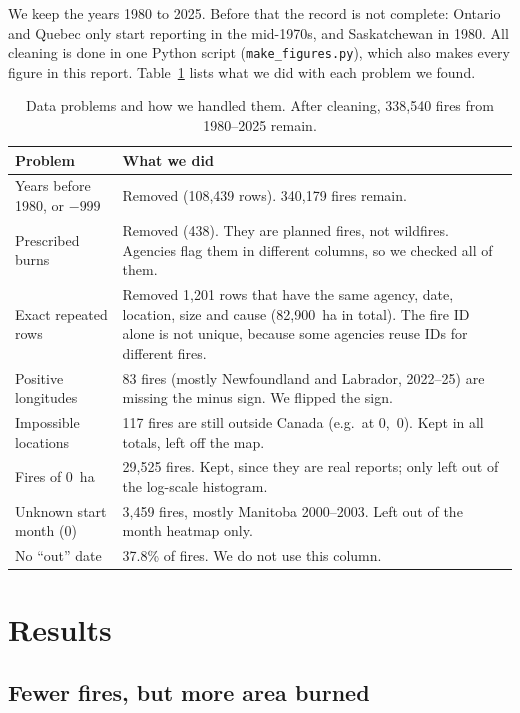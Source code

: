 \documentclass[12pt]{article}
\begin{document}
We keep the years 1980 to 2025. Before that the record is not complete:
Ontario and Quebec only start reporting in the mid-1970s, and Saskatchewan in
1980. All cleaning is done in one Python script
(\texttt{make\_figures.py}), which also makes every figure in this report.
Table~\ref{tab:cleaning} lists what we did with each problem we found.

\begin{table}[ht]
\centering
\small
\begin{tabular}{p{5.4cm}p{9.4cm}}
\toprule
\textbf{Problem} & \textbf{What we did} \\
\midrule
Years before 1980, or $-999$ & Removed (108,439 rows). 340,179 fires remain. \\
Prescribed burns & Removed (438). They are planned fires, not wildfires.
  Agencies flag them in different columns, so we checked all of them. \\
Exact repeated rows & Removed 1,201 rows that have the same agency, date,
  location, size and cause (82,900~ha in total). The fire ID alone is not
  unique, because some agencies reuse IDs for different fires. \\
Positive longitudes & 83 fires (mostly Newfoundland and Labrador, 2022--25)
  are missing the minus sign. We flipped the sign. \\
Impossible locations & 117 fires are still outside Canada (e.g.\ at 0,~0).
  Kept in all totals, left off the map. \\
Fires of 0~ha & 29,525 fires. Kept, since they are real reports; only left
  out of the log-scale histogram. \\
Unknown start month (0) & 3,459 fires, mostly Manitoba 2000--2003. Left out of
  the month heatmap only. \\
No ``out'' date & 37.8\% of fires. We do not use this column. \\
\bottomrule
\end{tabular}
\caption{Data problems and how we handled them. After cleaning, 338,540 fires
from 1980--2025 remain.}
\label{tab:cleaning}
\end{table}

\section{Results}

\subsection{Fewer fires, but more area burned}
\end{document}
